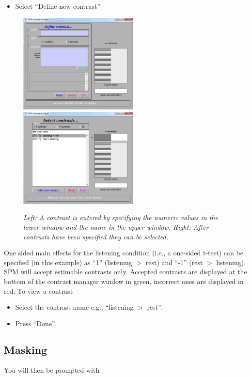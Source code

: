 \begin{itemize}
\item{Select ``Define new contrast''}
\end{itemize}
\begin{figure}
\includegraphics[width=60mm]{auditory/con_man2}
\includegraphics[width=60mm]{auditory/con_man3}
\caption{\emph{Left: A contrast is entered by specifying the numeric values in the lower window and the name in the upper window. Right: After contrasts have been specified they can be selected.}}
\end{figure}

One sided main effects for the listening condition (i.e., a one-sided t-test) can be specified (in this example) as ``1'' (listening $>$ rest) and ``-1'' (rest $>$ listening). SPM will accept estimable contrasts only. Accepted contrasts are displayed at the bottom of the contrast manager window in green, incorrect ones are displayed in red. To view a contrast

\begin{itemize}
\item Select the contrast name e.g., ``listening $>$ rest''.
\item Press ``Done''.
\end{itemize}

\subsection{Masking}

You will then be prompted with

